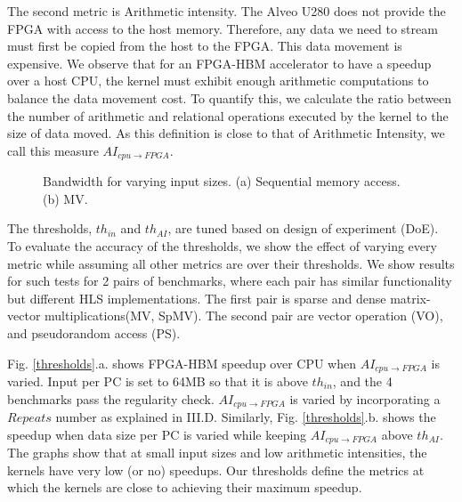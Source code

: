 \documentclass[manuscript,screen,review]{acmart}
\begin{document}
The second metric is Arithmetic intensity. The Alveo U280 does not provide the FPGA with access to the host memory. Therefore, any data we need to stream must first be copied from the host to the FPGA. This data movement is expensive. We observe that for an FPGA-HBM accelerator to have a speedup over a host CPU, the kernel must exhibit enough arithmetic computations to balance the data movement cost. To quantify this, we calculate the ratio between the number of arithmetic and relational operations executed by the kernel to the size of data moved. As this definition is close to that of Arithmetic Intensity, we call this measure $AI_{cpu\rightarrow FPGA}$.

\begin{figure}%
	\centering
	\qquad
	\caption{Bandwidth for varying input sizes. (a) Sequential memory access. (b) MV.}%
	\label{fig:example}%
\end{figure}

The thresholds, $th_{in}$ and $th_{AI}$, are tuned based on design of experiment (DoE).  
To evaluate the accuracy of the thresholds, we show the effect of varying every metric while assuming all other metrics are over their thresholds. We show results for such tests for 2 pairs of benchmarks, where each pair has similar functionality but different HLS implementations. The first pair is sparse and dense matrix-vector multiplications(MV, SpMV). The second pair are vector operation (VO), and pseudorandom access (PS). 


Fig. \ref{thresholds}.a. shows FPGA-HBM speedup over CPU when $AI_{cpu\rightarrow FPGA}$ is varied. Input per PC is set to 64MB so that it is above $th_{in}$, and the 4 benchmarks pass the regularity check. $AI_{cpu\rightarrow FPGA}$ is varied by incorporating a $Repeats$ number as explained in III.D. Similarly, Fig. \ref{thresholds}.b. shows the speedup when data size per PC is varied while keeping $AI_{cpu\rightarrow FPGA}$ above $th_{AI}$. The graphs show that at small input sizes and low arithmetic intensities, the kernels have very low (or no) speedups. Our thresholds define the metrics at which the kernels are close to achieving their maximum speedup.
\end{document}
